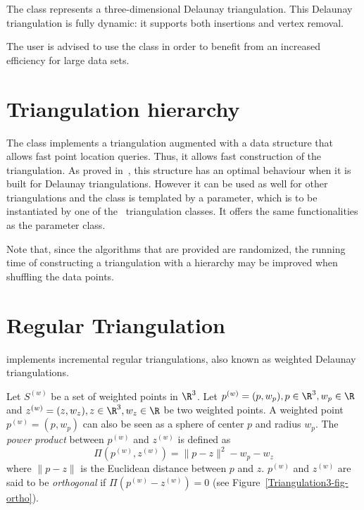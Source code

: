 The class 
represents a three-dimensional Delaunay triangulation. 
This Delaunay triangulation is fully dynamic: it supports both
insertions and vertex removal. 

The user is advised to use the class
 in order to benefit from an
increased efficiency for large data sets. 

\section{Triangulation hierarchy} 

The class  implements a
triangulation augmented with a data structure that allows fast point
location queries. Thus, it allows fast construction of the
triangulation. As proved in~\cite{d-iirdt-98}, this structure has an
optimal behaviour when it is built for Delaunay triangulations.
However it can be used as well for other triangulations and the
class  is templated by a parameter,
which is to be instantiated by one of the \cgal\ triangulation classes.
It offers the same functionalities as the  parameter class. 

Note that, since the algorithms that are provided are randomized, the
running time of constructing a triangulation with a hierarchy may be
improved when shuffling the data points.

\section{Regular Triangulation} 
\label{Triangulation3-sec-class-Regulartriangulation}

 implements incremental regular triangulations,
also known as weighted Delaunay triangulations.

Let ${S}^{(w)}$ be a set of weighted points in $\R^3$. Let
${p}^{(w)}=(p,w_p), p\in\R^3, w_p\in\R$ and 
${z}^{(w)}=(z,w_z), z\in\R^3, w_z\in\R$ be two weighted points. 
A weighted point
${p}^{(w)}=(p,w_p)$ can also be seen as a sphere of center $p$ and
radius $w_p$. 
The \textit{power product} between ${p}^{(w)}$ and ${z}^{(w)}$ is
defined as 
\[\Pi({p}^{(w)},{z}^{(w)}) = {\|{p-z}\|^2-w_p-w_z}\]
where $\|{p-z}\|$ is the Euclidean distance between $p$ and $z$. 
 ${p}^{(w)}$ and ${z}^{(w)}$
are said to be \textit{orthogonal} if $\Pi{({p}^{(w)}-{z}^{(w)})}
= 0$ (see Figure~\ref{Triangulation3-fig-ortho}).

